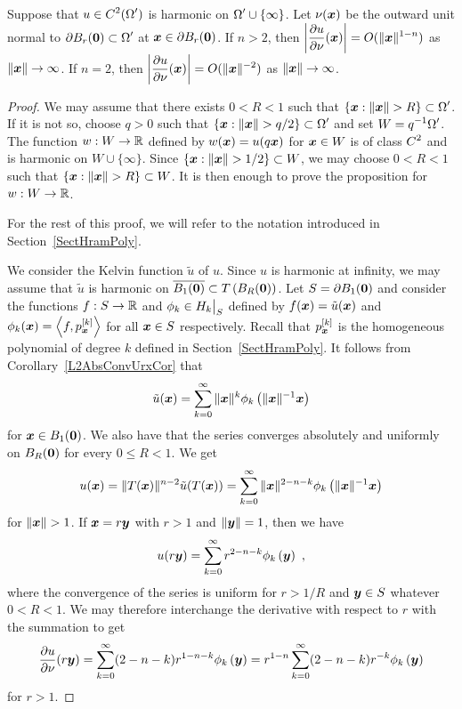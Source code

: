 \begin{prop} \label{pot_infty_ddu}
Suppose that $\displaystyle u\in C^2(\Omega^{\prime})$ is harmonic on
$\displaystyle \Omega^{\prime} \cup \{\infty\}$.  Let
$\nu({\bm{x}})$ be the outward
unit normal to $\displaystyle \partial B_r({\bm{0}}) \subset \Omega^{\prime}$ at
${\bm{x}} \in \partial B_r({\bm{0}})$.
If $n>2$, then
$\displaystyle \left| \frac{\partial{u}}{\partial \nu}({\bm{x}})\right| =
O(\|{\bm{x}}\|^{1-n})$ as $\|{\bm{x}}\|\rightarrow \infty$.  If $n=2$, then
$\displaystyle \left| \frac{\partial{u}}{\partial \nu}({\bm{x}})\right| =
O(\|{\bm{x}}\|^{-2})$ as $\|{\bm{x}}\|\rightarrow \infty$.
\end{prop}

\begin{proof}
We may assume that there exists $0<R<1$ such that
$\displaystyle \left\{ {\bm{x}} : \|{\bm{x}}\| > R \right\} \subset
\Omega^{\prime}$.
If it is not so, choose $q > 0$ such that 
$\displaystyle \left\{ {\bm{x}} : \|{\bm{x}}\| > q/2 \right\} \subset
\Omega^{\prime}$ and set $\displaystyle W = q^{-1} \Omega^{\prime}$.
The function $w: W \to \mathbb{R}$ defined by
$w({\bm{x}}) = u(q {\bm{x}})$ for ${\bm{x}} \in W$
is of class $\displaystyle C^2$ and is harmonic on $W \cup \{\infty\}$.
Since $\displaystyle \left\{ {\bm{x}} : \|{\bm{x}}\| > 1/2 \right\} \subset W$,
we may choose $0<R<1$ such that
$\displaystyle \left\{ {\bm{x}} : \|{\bm{x}}\| > R \right\} \subset W$.
It is then enough to prove the proposition for $w: W \to \mathbb{R}$.

For the rest of this proof, we will refer to the notation introduced
in Section~\ref{SectHramPoly}.

We consider the Kelvin function $\tilde{u}$ of $u$.  Since $u$ is
harmonic at infinity, we may assume that
$\tilde{u}$ is harmonic on
$\displaystyle \overline{B_1({\bm{0}})} \subset T\left(B_R({\bm{0}})\right)$.
Let $S = \partial B_1({\bm{0}})$ and consider the functions $f: S \to \mathbb{R}$
and $\displaystyle \phi_k \in H_k\big|_S$ defined by
$f({\bm{x}}) = \tilde{u}({\bm{x}})$ and
$\displaystyle \phi_k({\bm{x}}) = \left\langle{f} , {p_{{\bm{x}}}^{[k]}}\right\rangle$ for all
${\bm{x}} \in S$ respectively.  Recall that
$\displaystyle p_{{\bm{x}}}^{[k]}$ is the
homogeneous polynomial of degree $k$ defined in Section~\ref{SectHramPoly}.
It follows from Corollary~\ref{L2AbsConvUrxCor} that
\[
\tilde{u}({\bm{x}}) = \sum_{k=0}^\infty \|{\bm{x}}\|^k
\phi_k\left(\|{\bm{x}}\|^{-1}{\bm{x}}\right)
\]
for ${\bm{x}} \in B_1({\bm{0}})$.  We also have that the
series converges absolutely and uniformly on $B_R({\bm{0}})$ for every
$0 \leq R <1$.   We get
\[
u({\bm{x}}) = \|T({\bm{x}})\|^{n-2} \tilde{u}(T({\bm{x}}))  
= \sum_{k=0}^\infty \|{\bm{x}}\|^{2-n-k}
\phi_k\left(\|{\bm{x}}\|^{-1} {\bm{x}}\right)
\]
for $\|{\bm{x}}\| > 1$.  If
${\bm{x}} = r {\bm{y}}$ with $r > 1$ and $\|{\bm{y}}\|=1$, then we have
\[
u(r{\bm{y}}) = \sum_{k=0}^\infty r^{2-n-k} \phi_k\left({\bm{y}}\right) \ ,
\]
where the convergence of the series is uniform for $r>1/R$ and
${\bm{y}} \in S$ whatever $0 < R < 1$.  We may therefore interchange
the derivative with respect to $r$ with the summation to get
\begin{equation} \label{dudnurxO}
\frac{\partial{u}}{\partial \nu}(r {\bm{y}})
= \sum_{k=0}^\infty (2-n-k) r^{1-n-k} \phi_k\left({\bm{y}}\right)
= r^{1-n} \sum_{k=0}^\infty (2-n-k) r^{-k} \phi_k\left({\bm{y}}\right)
\end{equation}
for $r>1$.


\end{proof}
